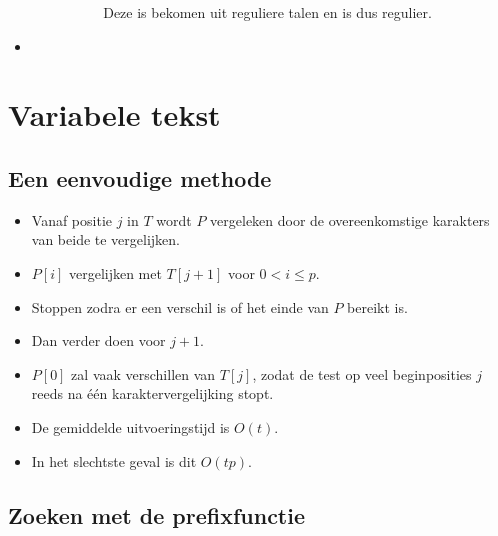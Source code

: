\begin{itemize}
\begin{itemize}
\begin{itemize}
\begin{enumerate}
                Deze is bekomen uit reguliere talen en is dus regulier.
            \end{enumerate}
        \end{itemize}
    \end{itemize}
    \item 
\end{itemize}




\section{Variabele tekst}


\subsection{Een eenvoudige methode}
\begin{itemize}
    \item Vanaf positie $j$ in $T$ wordt $P$ vergeleken door de overeenkomstige karakters van beide te vergelijken.
    \item $P[i]$ vergelijken met $T[j + 1]$ voor $0 < i \leq p$.
    \item Stoppen zodra er een verschil is of het einde van $P$ bereikt is.
    \item Dan verder doen voor $j + 1$.
    \item $P[0]$ zal vaak verschillen van $T[j]$, zodat de test op veel beginposities $j$ reeds na één karaktervergelijking stopt.
    \item De gemiddelde uitvoeringstijd is $O(t)$.
    \item In het slechtste geval is dit $O(tp)$.
\end{itemize}


\subsection{Zoeken met de prefixfunctie}
